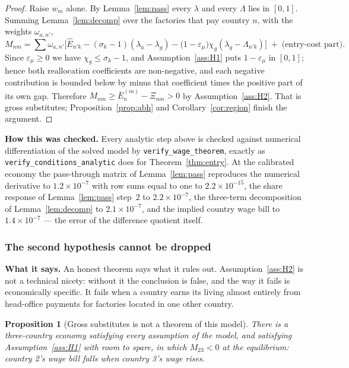 \documentclass[11pt]{article}
\newcommand{\says}[1]{\smallskip\noindent\textbf{What it says.} #1\smallskip}
\newcommand{\checked}[1]{\smallskip\noindent\textbf{How this was checked.} #1\smallskip}
\theoremstyle{plain}
\newtheorem{proposition}{Proposition}
\theoremstyle{remark}
\theoremstyle{definition}
\begin{document}
\begin{proof}
Raise $w_m$ alone. By Lemma~\ref{lem:pass} every $\lambda$ and every $\Lambda$ lies in
$[0,1]$. Summing Lemma~\ref{lem:decomp} over the factories that pay country $n$, with
the weights $\omega_{a,n'}$,
\[
  M_{nm}=\sum\omega_{a,n'}\Big[\hat E_{n'k}-(\sigma_k-1)(\lambda_a-\lambda_g)
        -\big(1-\varepsilon_\mu\big)\chi_g(\lambda_g-\Lambda_{n'k})\Big]
        \;+\;\text{(entry-cost part)} .
\]
Since $\varepsilon_\mu\ge0$ we have $\chi_g\le\sigma_k-1$, and
Assumption~\ref{ass:H1} puts $1-\varepsilon_\mu$ in $[0,1]$; hence both reallocation
coefficients are non-negative, and each negative contribution is bounded below by minus
that coefficient times the positive part of its own gap. Therefore
$M_{nm}\ge\bar E^{(m)}_n-\Xi_{nm}>0$ by Assumption~\ref{ass:H2}. That is gross
substitutes; Proposition~\ref{prop:abh} and Corollary~\ref{cor:region} finish the
argument.
\end{proof}

\checked{Every analytic step above is checked against numerical differentiation of the
solved model by \texttt{verify\_wage\_theorem}, exactly as
\texttt{verify\_conditions\_analytic} does for Theorem~\ref{thm:entry}. At the
calibrated economy the pass-through matrix of Lemma~\ref{lem:pass} reproduces the
numerical derivative to $1.2\times10^{-7}$ with row sums equal to one to
$2.2\times10^{-15}$, the share response of Lemma~\ref{lem:pass} step~2 to
$2.2\times10^{-7}$, the three-term decomposition of Lemma~\ref{lem:decomp} to
$2.1\times10^{-7}$, and the implied country wage bill to $1.4\times10^{-7}$ --- the
error of the difference quotient itself.}

\subsubsection{The second hypothesis cannot be dropped}
\label{sec:wagecounter}

\says{An honest theorem says what it rules out. Assumption~\ref{ass:H2} is not a
technical nicety: without it the conclusion is false, and the way it fails is
economically specific. It fails when a country earns its living almost entirely from
head-office payments for factories located in one other country.}

\begin{proposition}[Gross substitutes is not a theorem of this model]
\label{prop:wagecounter}
There is a three-country economy satisfying every assumption of the model, and
satisfying Assumption~\ref{ass:H1} with room to spare, in which
$M_{23}<0$ at the equilibrium: country 2's wage bill \emph{falls} when country 3's
wage rises.
\end{proposition}
\end{document}
